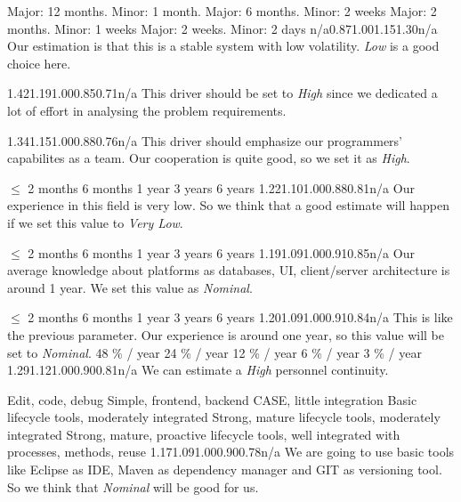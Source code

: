 { }{Major: 12 months. Minor: 1 month.}
{ Major: 6 months. Minor: 2 weeks } { Major: 2 months. Minor: 1 weeks }
{ Major: 2 weeks. Minor: 2 days } { }
{n/a}{0.87}{1.00}{1.15}{1.30}{n/a} {
    Our estimation is that this is a stable system with low volatility.
    \emph{Low} is a good choice here.
}

{1.42}{1.19}{1.00}{0.85}{0.71}{n/a} {
    This driver should be set to \emph{High} since we dedicated a lot of
    effort in analysing the problem requirements.
}

{1.34}{1.15}{1.00}{0.88}{0.76}{n/a} {
    This driver should emphasize our programmers' capabilites as a team. 
    Our cooperation is quite good, so we set it as \emph{High}.
}

{ $ \leq $ 2 months } { 6 months } {1 year } {3 years} {6 years} { }
{1.22}{1.10}{1.00}{0.88}{0.81}{n/a} { 
    Our experience in this field is very low. So we think that a good estimate
    will happen if we set this value to \emph {Very Low}.
}

{ $ \leq $ 2 months } { 6 months } {1 year } {3 years} {6 years} { }
{1.19}{1.09}{1.00}{0.91}{0.85}{n/a} { 
    Our average knowledge about platforms as databases, UI, client/server architecture
    is around 1 year. We set this value as \emph{Nominal}.
}

{ $ \leq $ 2 months } { 6 months } {1 year } {3 years} {6 years} { }
{1.20}{1.09}{1.00}{0.91}{0.84}{n/a} { 
    This is like the previous parameter. Our experience is around one year,
    so this value will be set to \emph{Nominal}.
}
\pagebreak
{}
{48 \% / year} { 24 \% / year} { 12 \% / year} { 6 \% / year} { 3 \% / year} { }
{1.29}{1.12}{1.00}{0.90}{0.81}{n/a} { 
    We can estimate a \emph{High} personnel continuity.
}

{Edit, code, debug}
{Simple, frontend, backend CASE, little integration}
{Basic lifecycle tools, moderately integrated}
{Strong, mature lifecycle tools, moderately integrated}
{Strong, mature, proactive lifecycle tools, well integrated with processes, methods, reuse}
{ }
{1.17}{1.09}{1.00}{0.90}{0.78}{n/a} { 
    We are going to use basic tools like Eclipse as IDE, Maven as dependency manager
    and GIT as versioning tool. So we think that \emph{Nominal} will be good for us.
}

